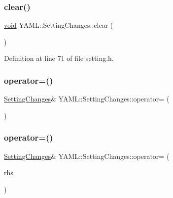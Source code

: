 \subsubsection{\texorpdfstring{clear()}{clear()}}
{\footnotesize\ttfamily \mbox{\hyperlink{glad_8h_a950fc91edb4504f62f1c577bf4727c29}{void}} Y\+A\+M\+L\+::\+Setting\+Changes\+::clear (\begin{DoxyParamCaption}{ }\end{DoxyParamCaption})\hspace{0.3cm}{\ttfamily [inline]}}



Definition at line 71 of file setting.\+h.

\mbox{\label{class_y_a_m_l_1_1_setting_changes_a33c013b522ef1bc257a5d62cea74abbe}} 
\subsubsection{\texorpdfstring{operator=()}{operator=()}\hspace{0.1cm}{\footnotesize\ttfamily [1/2]}}
{\footnotesize\ttfamily \mbox{\hyperlink{class_y_a_m_l_1_1_setting_changes}{Setting\+Changes}}\& Y\+A\+M\+L\+::\+Setting\+Changes\+::operator= (\begin{DoxyParamCaption}\item[{const \mbox{\hyperlink{class_y_a_m_l_1_1_setting_changes}{Setting\+Changes}} \&}]{ }\end{DoxyParamCaption})\hspace{0.3cm}{\ttfamily [delete]}}

\mbox{\label{class_y_a_m_l_1_1_setting_changes_a1f771f8ca4d357626d57c8f41fa9e075}} 
\subsubsection{\texorpdfstring{operator=()}{operator=()}\hspace{0.1cm}{\footnotesize\ttfamily [2/2]}}
{\footnotesize\ttfamily \mbox{\hyperlink{class_y_a_m_l_1_1_setting_changes}{Setting\+Changes}}\& Y\+A\+M\+L\+::\+Setting\+Changes\+::operator= (\begin{DoxyParamCaption}\item[{\mbox{\hyperlink{class_y_a_m_l_1_1_setting_changes}{Setting\+Changes}} \&\&}]{rhs }\end{DoxyParamCaption})\hspace{0.3cm}{\ttfamily [inline]}}



